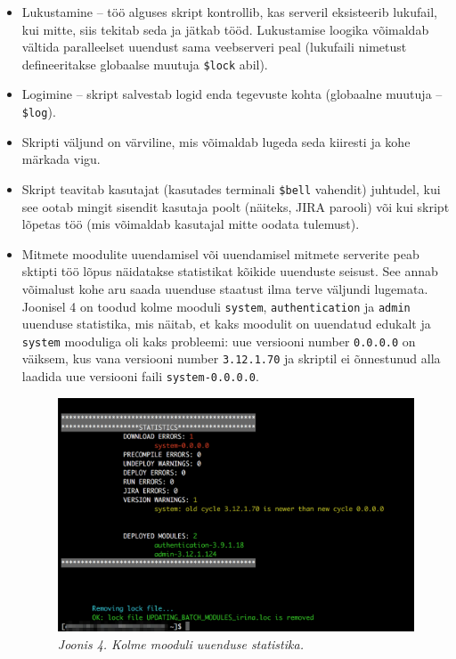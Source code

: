 \documentclass[12pt]{report}
\newcommand{\code}[1]{\texttt{#1}}
\begin{document}
  \begin{itemize}
    \item Lukustamine \--- töö alguses skript kontrollib, kas serveril eksisteerib lukufail, kui mitte, siis tekitab seda ja jätkab tööd. Lukustamise loogika võimaldab vältida paralleelset uuendust sama veebserveri peal (lukufaili nimetust defineeritakse globaalse muutuja \code{\$lock} abil).
    
    \item Logimine \--- skript salvestab logid enda tegevuste kohta (globaalne muutuja \--- \code{\$log}).
    
    \item Skripti väljund on värviline, mis võimaldab lugeda seda kiiresti ja kohe märkada vigu.
    
    \item Skript teavitab kasutajat (kasutades terminali \code{\$bell} vahendit) juhtudel, kui see ootab mingit sisendit kasutaja poolt (näiteks, JIRA parooli) või kui skript lõpetas töö (mis võimaldab kasutajal mitte oodata tulemust).
    
    \item Mitmete moodulite uuendamisel või uuendamisel mitmete serverite peab sktipti töö lõpus näidatakse statistikat kõikide uuenduste seisust. See annab võimalust kohe aru saada uuenduse staatust ilma terve väljundi lugemata. Joonisel 4 on toodud kolme mooduli \code{system}, \code{authentication} ja \code{admin} uuenduse statistika, mis näitab, et kaks moodulit on uuendatud edukalt ja \code{system} mooduliga oli kaks probleemi: uue versiooni number \code{0.0.0.0} on väiksem, kus vana versiooni number \code{3.12.1.70} ja skriptil ei õnnestunud alla laadida uue versiooni faili \code{system-0.0.0.0}.
    \begin{figure}[H]
     \begin{center}
       \includegraphics[width=.75\textwidth]{screenshots/statistics.png}
       \caption*{\textit{Joonis 4. Kolme mooduli uuenduse statistika.}}
     \end{center}
   \end{figure}
   

\end{itemize}
\end{document}
